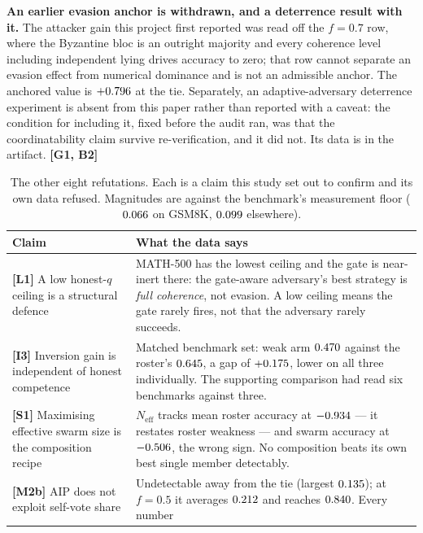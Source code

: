 \textbf{An earlier evasion anchor is withdrawn, and a deterrence result with it.}
The attacker gain this project first reported was read off the $f=0.7$ row, where
the Byzantine bloc is an outright majority and every coherence level including
independent lying drives accuracy to zero; that row cannot separate an evasion
effect from numerical dominance and is not an admissible anchor. The anchored
value is $+0.796$ at the tie. Separately, an adaptive-adversary
deterrence experiment is absent from this paper rather than reported with a
caveat: the condition for including it, fixed before the audit ran, was that the
coordinatability claim survive re-verification, and it did not. Its data is in
the artifact. \textbf{[G1, B2]}

\begin{table}[t]
\centering
\caption{The other eight refutations. Each is a claim this study set out to
confirm and its own data refused. Magnitudes are against the benchmark's
measurement floor ($0.066$ on GSM8K, $0.099$ elsewhere).}
\label{tab:refutations}
\footnotesize
\begin{tabular}{@{}p{}p{}@{}}
\toprule
Claim & What the data says \\
\midrule
\textbf{[L1]} A low honest-$q$ ceiling is a structural defence &
MATH-500 has the lowest ceiling and the gate is near-inert there: the gate-aware
adversary's best strategy is \emph{full coherence}, not evasion. A low ceiling
means the gate rarely fires, not that the adversary rarely succeeds. \\
\addlinespace
\textbf{[I3]} Inversion gain is independent of honest competence &
Matched benchmark set: weak arm $0.470$ against the roster's
$0.645$, a gap of $+0.175$, lower on
all three individually. The supporting comparison had read six benchmarks against
three. \\
\addlinespace
\textbf{[S1]} Maximising effective swarm size is the composition recipe &
$N_{\mathrm{eff}}$ tracks mean roster accuracy at $-0.934$ --- it
restates roster weakness --- and swarm accuracy at $-0.506$, the wrong
sign. No composition beats its own best single member detectably. \\
\addlinespace
\textbf{[M2b]} AIP does not exploit self-vote share &
Undetectable away from the tie (largest $0.135$); at $f=0.5$ it
averages $0.212$ and reaches $0.840$. Every number

\end{tabular}
\end{table}
